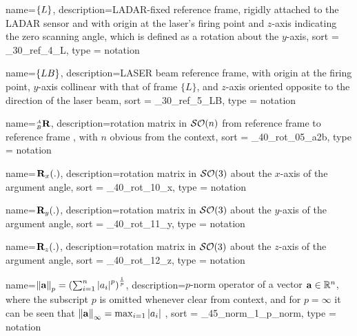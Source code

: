 {
  name={\ensuremath{\frameL}},
  description={LADAR-fixed reference frame, rigidly attached to the LADAR sensor 
                and with origin at the laser's firing point and $z$-axis 
                indicating the zero scanning angle, which is defined as a 
                rotation about the $y$-axis},
  sort = _30_ref_4_L,
  type = notation
}

{
  name={\ensuremath{\frameLB}},
  description={LASER beam reference frame, with origin at the firing point, 
                $y$-axis collinear with that of frame $\{L\}$, and $z$-axis 
                oriented opposite to the direction of the laser beam},
  sort = _30_ref_5_LB,
  type = notation
}


{
  name={\ensuremath{\rot{A}{B}}},
  description={rotation matrix in $\mathcal{SO}(n)$ from reference frame  to 
                reference frame , with $n$ obvious from the context},
  sort = _40_rot_05_a2b,
  type = notation
}

{
  name={\ensuremath{\rot{}{}_{x}(.)}},
  description={rotation matrix in $\mathcal{SO}(3)$ about the $x$-axis of the argument angle},
  sort = _40_rot_10_x,
  type = notation
}

{
  name={\ensuremath{\rot{}{}_{y}(.)}},
  description={rotation matrix in $\mathcal{SO}(3)$ about the $y$-axis of the argument angle},
  sort = _40_rot_11_y,
  type = notation
}

{
  name={\ensuremath{\rot{}{}_{z}(.)}},
  description={rotation matrix in $\mathcal{SO}(3)$ about the $z$-axis of the argument angle},
  sort = _40_rot_12_z,
  type = notation
}


{
  name={\ensuremath{ \norm{\bvec{a}}_p = \left(\sum_{i = 1}^{n} \abs{a_i}^p\right)^{\frac{1}{p}}}},
  description={$p$-norm operator of a vector $\mathbf{a} \in \mathbb{R}^n$, where the 
                subscript $p$ is omitted whenever clear from context, and for 
                $p = \infty$ it can be seen that $\left\|\mathbf{a}\right\|_\infty = \max_{i = 1} \left|a_i\right|$ },
  sort = _45_norm_1_p_norm,
  type = notation
}

